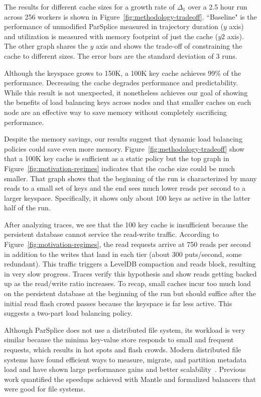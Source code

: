The results for different cache sizes for a growth rate of \(\Delta_1\) over a
2.5 hour run across 256 workers is shown in
Figure~\ref{fig:methodology-tradeoff}.  ``Baseline" is the performance of
unmodified ParSplice  measured in trajectory duration (\(y\) axis) and
utilization is measured with memory footprint of just the cache (\(y2\) axis).
The other graph shares the \(y\) axis and shows the trade-off of constraining
the cache to different sizes.  The error bars are the standard deviation of 3
runs. 

Although the keyspace grows to 150K, a 100K key cache achieves 99\% of the
performance. Decreasing the cache degrades performance and predictability.
While this result is not unexpected, it nonetheless achieves our goal of
showing the benefits of load balancing keys across nodes and that smaller
caches on each node are an effective way to save memory without completely
sacrificing performance.

Despite the memory savings, our results suggest that dynamic load balancing
policies could save even more memory.  Figure~\ref{fig:methodology-tradeoff}
show that a 100K key cache is sufficient as a static policy but the top graph
in Figure~\ref{fig:motivation-regimes} indicates that the cache size could be
much smaller. That graph shows that the beginning of the run is characterized
by many reads to a small set of keys and the end sees much lower reads per
second to a larger keyspace. Specifically, it shows only about 100 keys as
active in the latter half of the run.

After analyzing traces, we see that the 100 key cache is insufficient because
the persistent database cannot service the read-write traffic.  According to
Figure~\ref{fig:motivation-regimes}, the read requests arrive at 750 reads per
second in addition to the writes that land in each tier (about 300 puts/second,
some redundant). This traffic triggers a LevelDB compaction and reads block,
resulting in very slow progress.  Traces verify this hypothesis and show reads
getting backed up as the read/write ratio increases. To recap, small caches
incur too much load on the persistent database  at the beginning of the run but
should suffice after the initial read flash crowd passes because
the keyspace is far less active. This suggests a two-part load balancing
policy.

Although ParSplice does not use a distributed file system, its workload is very
similar because the minima key-value store responds to small and frequent
requests, which results in hot spots and flash crowds.  Modern distributed file
systems have found efficient ways to measure, migrate, and partition metadata
load and have shown large performance gains and
better scalability~\cite{zheng:pdsw2014-batchfs, zheng:pdsw2015-deltafs,
grider:pdsw2015-marfs, ren:sc2014-indexfs, patil:fast2011-giga+,
brandt:msst2003-lh}.  Previous work quantified the speedups achieved with
Mantle and formalized balancers that were good for file systems.

